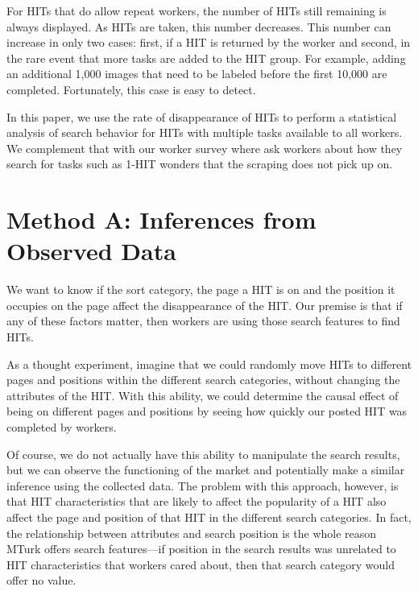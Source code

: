 \documentclass{acm_proc_article-sp}
\begin{document}
For HITs that do allow repeat workers, the number of HITs still
remaining is always displayed.  As HITs are taken, this number
decreases.  This number can increase in only two cases: first, if a
HIT is returned by the worker and second, in the rare event that more
tasks are added to the HIT group.  For example, adding an additional
1,000 images that need to be labeled before the first 10,000 are
completed.  Fortunately, this case is easy to detect.

In this paper, we use the rate of disappearance of HITs to perform a
statistical analysis of search behavior for HITs with multiple tasks
available to all workers.  We complement that with our worker survey
where ask workers about how they search for tasks such as 1-HIT wonders that the scraping does not pick up on.

\section{Method A: Inferences from Observed Data}
We want to know if the sort category, the page a HIT is on and the
position it occupies on the page affect the disappearance of the HIT.
Our premise is that if any of these factors matter, then workers are
using those search features to find HITs. 

As a thought experiment, imagine that we could randomly move HITs to
different pages and positions within the different search categories,
without changing the attributes of the HIT. With this ability, we could
determine the causal effect of being on different pages and positions
by seeing how quickly our posted HIT was completed by workers. 

Of course, we do not actually have this ability to manipulate the
search results, but we can observe the functioning of the market and
potentially make a similar inference using the collected data. The
problem with this approach, however, is that HIT characteristics that
are likely to affect the popularity of a HIT also affect the page and
position of that HIT in the different search categories. In fact, the
relationship between attributes and search position is the whole
reason MTurk offers search features---if position in the search results
was unrelated to HIT characteristics that workers cared about, then
that search category would offer no value.
\end{document}
